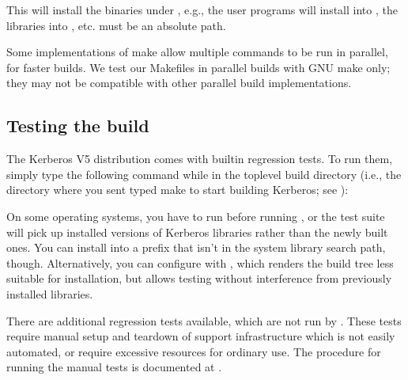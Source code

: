 \documentclass[letterpaper,10pt,english]{sphinxmanual}
\begin{document}
\sphinxAtStartPar
This will install the binaries under , e.g., the user
programs will install into , the libraries into
, etc.   must be an absolute path.

\sphinxAtStartPar
Some implementations of make allow multiple commands to be run in
parallel, for faster builds.  We test our Makefiles in parallel builds
with GNU make only; they may not be compatible with other parallel
build implementations.


\subsection{Testing the build}
\label{\detokenize{build/doing_build:testing-the-build}}
\sphinxAtStartPar
The Kerberos V5 distribution comes with built\sphinxhyphen{}in regression tests.  To
run them, simply type the following command while in the top\sphinxhyphen{}level
build directory (i.e., the directory where you sent typed make to
start building Kerberos; see {\hyperref[\detokenize{build/doing_build:do-build}]{}}):

\begin{sphinxVerbatim}[commandchars=\\\{\}]
 
\end{sphinxVerbatim}

\sphinxAtStartPar
On some operating systems, you have to run  before
running , or the test suite will pick up installed
versions of Kerberos libraries rather than the newly built ones.  You
can install into a prefix that isn’t in the system library search
path, though.  Alternatively, you can configure with
\sphinxstylestrong{\sphinxhyphen{}}, which renders the build tree less suitable
for installation, but allows testing without interference from
previously installed libraries.

\sphinxAtStartPar
There are additional regression tests available, which are not run
by .  These tests require manual setup and teardown of
support infrastructure which is not easily automated, or require
excessive resources for ordinary use.  The procedure for running
the manual tests is documented at
.
\end{document}
